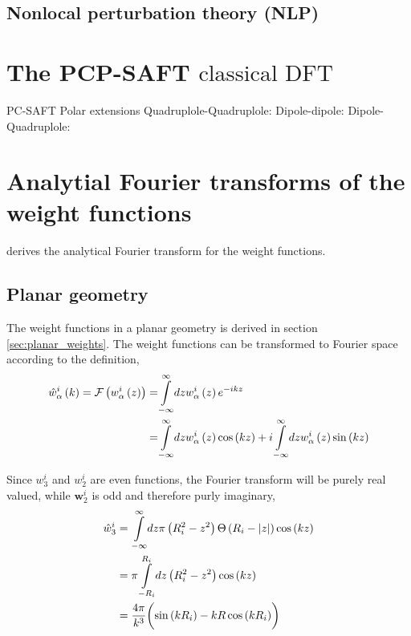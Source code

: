 \documentclass[12pt, letterpaper]{article}
\newcommand*{\abs}[1]{\lvert#1\rvert}
\newcommand*{\lb}{\ensuremath{\left(}}
\newcommand*{\rb}{\ensuremath{\right)}}
\newcommand{\cdft}{\ensuremath{\text{classical DFT}}\xspace}
\begin{document}
\subsection{Nonlocal perturbation theory (NLP)}
\citet{gloor2004}
\citet{gross2009}

\section{The PCP-SAFT \cdft}

\citet{sauer2017}

PC-SAFT \citet{gross2001}
Polar extensions
Quadruplole-Quadruplole:\citet{gross2005}
Dipole-dipole:\citet{gross2006}
Dipole-Quadruplole: \citet{vrabec2008}


\section{Analytial Fourier transforms of the weight functions}
\citet[Appendix B]{knepley2010} derives the analytical Fourier
transform for the weight functions.

\subsection{Planar geometry}
The weight functions in a planar geometry is derived in section
\ref{sec:planar_weights}. The weight functions can be transformed to
Fourier space according to the definition,
\begin{align}
  \label{eq:fourier}
  \hat{w}_\alpha^i \lb k \rb = \mathcal{F}\lb w_\alpha^i \lb z \rb \rb =& \overset{\infty}{\underset{-\infty}{\int}} dz w_\alpha^i \lb z \rb e^{-i k z} \nonumber \\
  =& \overset{\infty}{\underset{-\infty}{\int}} dz w_\alpha^i \lb z \rb \cos \lb k z \rb + i \overset{\infty}{\underset{-\infty}{\int}} dz w_\alpha^i \lb z \rb \sin \lb k z \rb
\end{align}

Since $w_3^i$ and $w_2^i$ are even functions, the Fourier transform
will be purely real valued, while $\mathbf{w}_2^i$ is odd and
therefore purly imaginary,
\begin{align}
  \hat{w}_3^i &=  \overset{\infty}{\underset{-\infty}{\int}} dz  \pi \lb R_i^2 - z^2 \rb \Theta \lb R_i - \abs{z} \rb \cos \lb k z \rb \nonumber \\
              &=  \pi \overset{R_i}{\underset{-R_i}{\int}} dz  \lb R_i^2 - z^2 \rb \cos \lb k z \rb  \nonumber \\
              &=  \frac{4 \pi}{k^3} \biggl( \sin \lb k R_i \rb - k R\cos \lb k R_i \rb \biggr) \label{eq:w_hat_3}
\end{align}
\end{document}
